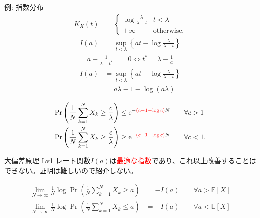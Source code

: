\documentclass[lualatex,handout]{beamer}
\newcommand{\emm}[1]{\textcolor{red}{#1}}
\newcommand{\expt}[1]{\mathbb{E}\left[#1\right]}
\theoremstyle{definition}
\begin{document}
\begin{frame}{例: 指数分布}
\small
\begin{align*}
K_X(t) &=
\begin{cases}
\log\frac{\lambda}{\lambda-t}& t < \lambda\\
+\infty&\text{otherwise.}
\end{cases}
\end{align*}
\begin{align*}
I(a) &= \sup_{t<\lambda} \left\{at - \log\frac{\lambda}{\lambda-t}\right\}
\end{align*}
\begin{align*}
a - \frac1{\lambda-t^*} &=0 \iff  t^* = \lambda-\frac1a
\end{align*}
\begin{align*}
I(a) &= \sup_{t<\lambda} \left\{at - \log\frac{\lambda}{\lambda-t}\right\}\\
&=
a\lambda - 1 - \log(a\lambda)
\end{align*}

\begin{align*}
\Pr\left(\frac1N\sum_{k=1}^N X_k \ge \frac{c}{\lambda}\right) &\le \mathrm{e}^{-\emm{(c-1-\log c)}N} \qquad\forall c>1\\
\Pr\left(\frac1N\sum_{k=1}^N X_k \ge \frac{c}{\lambda}\right) &\ge \mathrm{e}^{-\emm{(c-1-\log c)}N} \qquad\forall c<1.
\end{align*}
\end{frame}


\begin{frame}{大偏差原理 Lv1}
レート関数$I(a)$は\emm{最適な指数}であり、これ以上改善することはできない。証明は難しいので紹介しない。
\begin{theorem}[クラメールの定理]
\begin{align*}
\lim_{N\to\infty}\frac1N \log \Pr\left(\frac1N\sum_{k=1}^N X_k \ge a\right) &= -I(a) \qquad\forall a>\expt{X}\\
\lim_{N\to\infty}\frac1N \log \Pr\left(\frac1N\sum_{k=1}^N X_k \le a\right) &= -I(a) \qquad\forall a<\expt{X}
\end{align*}
\end{theorem}
\end{frame}
\end{document}
